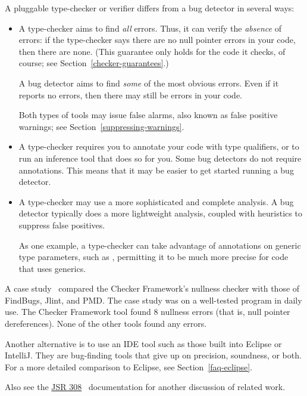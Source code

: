 A pluggable type-checker or verifier
differs from a bug detector in several ways:
\begin{itemize}
\item
  A type-checker aims to find \emph{all} errors.  Thus, it can verify the
  \emph{absence} of errors:  if the type-checker says there are no null
  pointer errors in your code, then there are none.  (This guarantee only
  holds for the code it checks, of course; see
  Section~\ref{checker-guarantees}.)

  A bug detector aims to find \emph{some} of the most obvious errors.  Even
  if it reports no errors, then there may still be errors in your code.

  Both types of tools may issue false alarms,
  also known as false positive warnings;
  see Section~\ref{suppressing-warnings}.

\item
  A type-checker requires you to annotate your code with type qualifiers,
  or to run an inference tool that does so for you.  Some bug detectors do not
  require annotations.  This means that it may be easier to get started
  running a bug detector.

\item
  A type-checker may use a more sophisticated and complete analysis.
  A bug detector typically does a more lightweight analysis, coupled with
  heuristics to suppress false positives.

  As one example, a type-checker can take advantage of annotations on
  generic type parameters, such as , permitting
  it to be much more precise for code that uses generics.

\end{itemize}

A case study~\cite[\S6]{PapiACPE2008} compared the Checker Framework's nullness
checker with those of FindBugs, Jlint, and PMD\@.  The case study was on a
well-tested program in daily use.  The Checker Framework tool found 8
nullness errors (that is, null pointer dereferences).  None of the other
tools found any errors.

Another alternative is to use an IDE tool such as those built into Eclipse
or IntelliJ\@.  They are bug-finding tools that give up on precision,
soundness, or both.
For a more detailed comparison to Eclipse, see Section~\ref{faq-eclipse}.

Also see the
\href{https://checkerframework.org/jsr308/}{JSR 308}~\cite{JSR308-2008-09-12}
documentation for another discussion of related work.


